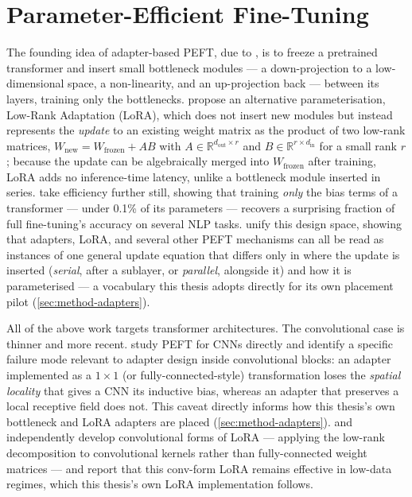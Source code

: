 \documentclass{iutbscthesis}
\begin{document}
\section{Parameter-Efficient Fine-Tuning}
\label{sec:related-peft}

The founding idea of adapter-based PEFT, due to \textcite{houlsby2019adapters}, is to freeze a pretrained transformer and insert small bottleneck modules — a down-projection to a low-dimensional space, a non-linearity, and an up-projection back — between its layers, training only the bottlenecks. \textcite{hu2022lora} propose an alternative parameterisation, Low-Rank Adaptation (LoRA), which does not insert new modules but instead represents the \emph{update} to an existing weight matrix as the product of two low-rank matrices, $W_{\text{new}} = W_{\text{frozen}} + AB$ with $A \in \mathbb{R}^{d_{\text{out}} \times r}$ and $B \in \mathbb{R}^{r \times d_{\text{in}}}$ for a small rank $r$; because the update can be algebraically merged into $W_{\text{frozen}}$ after training, LoRA adds no inference-time latency, unlike a bottleneck module inserted in series. \textcite{benzaken2022bitfit} take efficiency further still, showing that training \emph{only} the bias terms of a transformer — under 0.1\% of its parameters — recovers a surprising fraction of full fine-tuning's accuracy on several NLP tasks. \textcite{he2022unified} unify this design space, showing that adapters, LoRA, and several other PEFT mechanisms can all be read as instances of one general update equation that differs only in where the update is inserted (\emph{serial}, after a sublayer, or \emph{parallel}, alongside it) and how it is parameterised — a vocabulary this thesis adopts directly for its own placement pilot (\autoref{sec:method-adapters}).

All of the above work targets transformer architectures. The convolutional case is thinner and more recent. \textcite{chen2024convadapter} study PEFT for CNNs directly and identify a specific failure mode relevant to adapter design inside convolutional blocks: an adapter implemented as a $1{\times}1$ (or fully-connected-style) transformation loses the \emph{spatial locality} that gives a CNN its inductive bias, whereas an adapter that preserves a local receptive field does not. This caveat directly informs how this thesis's own bottleneck and LoRA adapters are placed (\autoref{sec:method-adapters}). \textcite{aleem2024convlora} and \textcite{zhong2024convlorasam} independently develop convolutional forms of LoRA — applying the low-rank decomposition to convolutional kernels rather than fully-connected weight matrices — and report that this conv-form LoRA remains effective in low-data regimes, which this thesis's own LoRA implementation follows.
\end{document}
